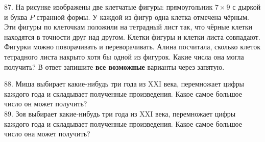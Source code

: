 \documentclass[12pt]{article}
\begin{document}
87. На рисунке изображены две клетчатые фигуры: прямоугольник $7\times9$ с дыркой и буква $P$ странной формы. У каждой из фигур одна клетка отмечена чёрным. Эти фигуры по клеточкам положили на тетрадный лист так, что чёрные клетки находятся в точности друг над другом. Клетки фигуры и клетки листа совпадают. Фигурки можно поворачивать и переворачивать. Алина посчитала, сколько клеток тетрадного листа накрыто хотя бы одной из фигурок. Какие числа она могла получить? В ответ запишите {\bf все возможные} варианты через запятую.
\begin{center}
\begin{figure}[ht!]
\end{figure}
\end{center}
88. Миша выбирает какие-нибудь три года из XXI века, перемножает цифры каждого года и складывает полученные произведения. Какое самое большое число он может получить?\\
89. Зоя выбирает какие-нибудь три года из XXI века, перемножает цифры каждого года и складывает полученные произведения. Какое самое большое число она может получить?\\
\end{document}
